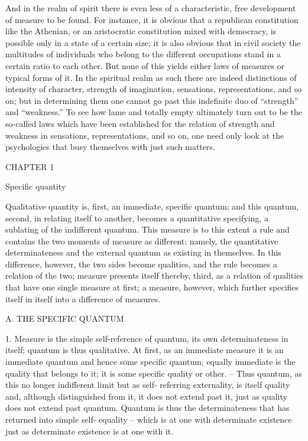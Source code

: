 And in the realm of spirit there is even less of a characteristic, free
development of measure to be found.
For instance, it is obvious that a
republican constitution like the Athenian, or an aristocratic constitution
mixed with democracy, is possible only in a state of a certain size;
it is also obvious that in civil society the multitudes of individuals
who belong to the different occupations stand in a certain ratio to each other.
But none of this yields either laws of measures or typical forms of it.
In the spiritual realm as such there are indeed distinctions of intensity of
character, strength of imagination, sensations, representations, and so on;
but in determining them one cannot go past this indefinite duo of
“strength” and “weakness.”
To see how lame and totally empty ultimately turn out to be
the so-called laws which have been established for
the relation of strength and weakness in sensations, representations,
and so on, one need only look at the psychologies
that busy themselves with just such matters.

CHAPTER 1

Specific quantity

Qualitative quantity is, first, an immediate, specific quantum;
and this quantum, second, in relating itself to another,
becomes a quantitative specifying, a sublating of the indifferent quantum.
This measure is to this extent a rule
and contains the two moments of measure as different;
namely, the quantitative determinateness and
the external quantum as existing in themselves.
In this difference, however, the two sides become qualities, and
the rule becomes a relation of the two; measure presents itself thereby,
third, as a relation of qualities that have one single measure at first;
a measure, however, which further specifies itself in itself into
a difference of measures.

A. THE SPECIFIC QUANTUM

1. Measure is the simple self-reference of quantum, its own determinateness
in itself; quantum is thus qualitative. At first, as an immediate measure
it is an immediate quantum and hence some specific quantum; equally
immediate is the quality that belongs to it; it is some specific quality or
other. – Thus quantum, as this no longer indifferent limit but as self-
referring externality, is itself quality and, although distinguished from it,
it does not extend past it, just as quality does not extend past quantum.
Quantum is thus the determinateness that has returned into simple self-
equality – which is at one with determinate existence just as determinate
existence is at one with it.


